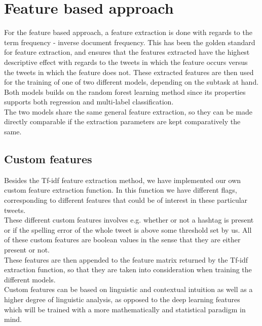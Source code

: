 
\section{Feature based approach}\label{sec:feature}

For the feature based approach, a feature extraction is done with regards to the term frequency - inverse document frequency. This has been the golden standard for feature extraction, and ensures that the features extracted have the highest descriptive effect with regards to the tweets in which the feature occurs versus the tweets in which the feature does not. These extracted features are then used for the training of one of two different models, depending on the subtask at hand.\\
Both models builds on the random forest learning method since its properties supports both regression and multi-label classification. \\
The two models share the same general feature extraction, so they can be made directly comparable if the extraction parameters are kept comparatively the same.

\subsection{Custom features}
Besides the Tf-idf feature extraction method, we have implemented our own custom feature extraction function. In this function we have different flags, corresponding to different features that could be of interest in these particular tweets. \\
These different custom features involves e.g. whether or not a hashtag is present or if the spelling error of the whole tweet is above some threshold set by us. All of these custom features are boolean values in the sense that they are either present or not. \\
These features are then appended to the feature matrix returned by the Tf-idf extraction function, so that they are taken into consideration when training the different models. \\
Custom features can be based on linguistic and contextual intuition as well as a higher degree of linguistic analysis, as opposed to the deep learning features which will be trained with a more mathematically and statistical paradigm in mind.


